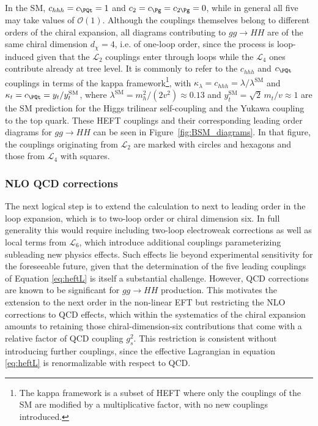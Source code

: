 In the SM, $c_{hhh} = c_\PQt = 1$ and $c_2 = c_\Pg = c_{2\Pg} = 0$, while in general all five may take values of $\mathcal{O}(1)$. Although the couplings themselves belong to different orders of the chiral expansion, all diagrams contributing to $gg\to HH$ are of the same chiral dimension $d_\chi = 4$, i.e. of one-loop order, since the process is loop-induced given that the $\mathcal{L}_2$ couplings enter through loops while the $\mathcal{L}_4$ ones contribute already at tree level. It is commonly to refer to the $c_{hhh}$ and $c_\PQt$ couplings in terms of the kappa framework\footnote{The kappa framework is a subset of HEFT where only the couplings of the SM are modified by a multiplicative factor, with no new couplings introduced.}\cite{LHCHiggsCrossSectionWorkingGroup:2013rie,deFlorian:2016spz}, with $\kappa_\lambda=c_{hhh}=\lambda/\lambda^{\text{SM}}$ and $\kappa_t=c_\PQt=y_t/y_t^\text{SM}$, where $\lambda^{\text{SM}}=m_h^2 /(2 v^2)\approx0.13$ and $y^{\text{SM}}_t=\sqrt{2}\,m_t/v\approx1$ are the SM prediction for the Higgs trilinear self-coupling and the Yukawa coupling to the top quark. These HEFT couplings and their corresponding leading order diagrams for $gg\to HH$ can be seen in Figure~\ref{fig:BSM_diagrams}. In that figure, the couplings originating from $\mathcal{L}_2$ are marked with circles and hexagons and those from $\mathcal{L}_4$ with squares.


\subsubsection{NLO QCD corrections}
The next logical step is to extend the calculation to next to leading order in the loop expansion, which is to two-loop order or chiral dimension six. In full generality this would require including two-loop electroweak corrections as well as local terms from $\mathcal{L}_6$, which introduce additional couplings parameterizing subleading new physics effects. Such effects lie beyond experimental sensitivity for the foreseeable future, given that the determination of the five leading couplings of Equation \ref{eq:heftL} is itself a substantial challenge. However, QCD corrections are known to be significant for $gg\to HH$ production. This motivates the extension to the next order in the non-linear EFT but restricting the NLO corrections to QCD effects, which within the systematics of the chiral expansion amounts to retaining those chiral-dimension-six contributions that come with a relative factor of QCD coupling $g_s^2$. This restriction is consistent without introducing further couplings, since the effective Lagrangian in equation \ref{eq:heftL} is renormalizable with respect to QCD.

